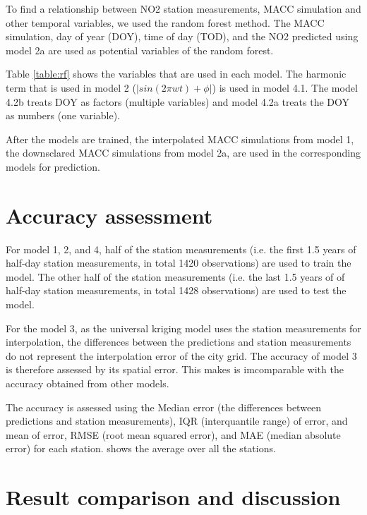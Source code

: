 \documentclass{article}
\begin{document}
To find a relationship between NO2 station measurements, MACC simulation and other temporal
variables, we used the random forest method. The MACC simulation, day of year (DOY),
time of day (TOD), and the NO2 predicted using model 2a are used as potential variables of the random forest.

Table \ref{table:rf} shows the variables that are used in each
model. The harmonic term that is used in model 2
($|sin(2 \pi wt) + \phi|$) is used in model 4.1. The model 4.2b treats DOY as factors (multiple variables) and model 4.2a treats the DOY as numbers (one variable). 

After the models are trained, the interpolated MACC simulations from model 1, the downsclared MACC simulations from model 2a, are used in the corresponding models for prediction. 


 


\section{Accuracy assessment}


For model 1, 2, and 4, half of the station measurements (i.e. the first 1.5 years of half-day station measurements,
in total 1420 observations) are used to train the model. The other half of 
the station measurements (i.e. the last 1.5 years of of half-day station measurements, in total
1428 observations) are used to test the model.  

For the model 3, as the universal kriging model uses the station measurements for interpolation, the differences between the predictions and station measurements do not represent the interpolation error of the city grid. The accuracy of model 3 is therefore assessed by its spatial error. This makes is imcomparable with the accuracy obtained from other models.  

The accuracy is assessed using the Median error (the differences between predictions and station measurements), IQR (interquantile range) of error, and mean of error,  RMSE (root mean squared error), and MAE (median absolute error) for each station.  shows the average over all the stations.  

\section{Result comparison and discussion}
\end{document}
